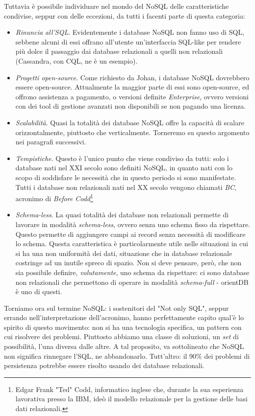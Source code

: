 Tuttavia è possibile individuare nel mondo del NoSQL delle caratteristiche condivise, seppur con delle eccezioni, da tutti i facenti parte di questa categoria:
\begin{itemize}
\item \emph{Rinuncia all'SQL}. Evidentemente i database NoSQL non fanno uso di SQL, sebbene alcuni di essi offrano all'utente un'interfaccia SQL-like per rendere più dolce il passaggio dai database relazionali a quelli non relazionali (Cassandra, con CQL, ne è un esempio).
\item \emph{Progetti open-source}. Come richiesto da Johan, i database NoSQL dovrebbero essere open-source. Attualmente la maggior parte di essi sono open-source, ed offrono assistenza a pagamento, o versioni definite \emph{Enterprise}, ovvero versioni con dei tool di gestione avanzati non disponibili se non pagando una licenza.
\item \emph{Scalabilità}. Quasi la totalità dei database NoSQL offre la capacità di scalare orizzontalmente, piuttosto che verticalmente. Torneremo su questo argomento nei paragrafi successivi.
\item \emph{Tempistiche}. Questo è l'unico punto che viene condiviso da tutti: solo i database nati nel XXI secolo sono definiti NoSQL, in quanto nati con lo scopo di soddisfare le necessità che in questo periodo si sono manifestate. Tutti i database non relazionali nati nel XX secolo vengono chiamati \emph{BC}, acronimo di 
\emph{Before Codd}\footnote{Edgar Frank "Ted" Codd, informatico inglese che, durante la sua esperienza lavorativa presso la IBM, ideò il modello relazionale per la gestione delle basi dati relazionali.}
\item \emph{Schema-less}. La quasi totalità dei database non relazionali permette di lavorare in modalità \emph{schema-less}, ovvero senza uno schema fisso da rispettare. Questo permette di aggiungere campi ai record senza necessità di modificare lo schema. Questa caratteristica è particolarmente utile nelle situazioni in cui si ha una non uniformità dei dati, situazione che in database relazionale costringe ad un inutile spreco di spazio. Non si deve pensare, però, che non sia possibile definire, \emph{volutamente}, uno schema da rispettare: ci sono database non relazionali che permettono di operare in modalità \emph{schema-full} - orientDB è uno di questi.
\end{itemize}

Torniamo ora sul termine NoSQL: i sostenitori del "Not only SQL", seppur errando nell'interpretazione dell'acronimo, hanno perfettamente capito qual'è lo spirito di questo movimento: non si ha una tecnologia specifica, un pattern con cui risolvere dei problemi. Piuttosto abbiamo una classe di soluzioni, un \emph{set} di possibilità, l'una diversa dalle altre. A tal proposito, va sottolineato che NoSQL non significa rinnegare l'SQL, ne abbandonarlo. Tutt'altro: il 90\% dei problemi di persistenza potrebbe essere risolto usando dei database relazionali.

